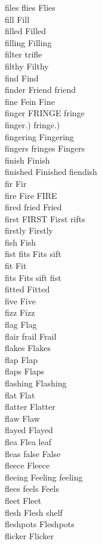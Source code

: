 files flies Flies\\
fill Fill\\
filled Filled\\
filling Filling\\
filter trifle\\
filthy Filthy\\
find Find\\
finder Friend friend\\
fine Fein Fine\\
finger FRINGE fringe\\
finger.) fringe.)\\
fingering Fingering\\
fingers fringes Fingers\\
finish Finish\\
finished Finished fiendish\\
fir Fir\\
fire Fire FIRE\\
fired fried Fried\\
first FIRST First rifts\\
firstly Firstly\\
fish Fish\\
fist fits Fits sift\\
fit Fit\\
fits Fits sift fist\\
fitted Fitted\\
five Five\\
fizz Fizz\\
flag Flag\\
flair frail Frail\\
flakes Flakes\\
flap Flap\\
flaps Flaps\\
flashing Flashing\\
flat Flat\\
flatter Flatter\\
flaw Flaw\\
flayed Flayed\\
flea Flea leaf\\
fleas false False\\
fleece Fleece\\
fleeing Feeling feeling\\
flees feels Feels\\
fleet Fleet\\
flesh Flesh shelf\\
fleshpots Fleshpots\\
flicker Flicker\\
